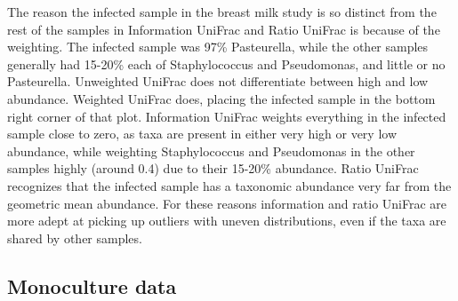\documentclass[10pt,letterpaper]{article}
\begin{document}
The reason the infected sample in the breast milk study is so distinct from the rest of the samples in Information UniFrac and Ratio UniFrac is because of the weighting. The infected sample was 97\% Pasteurella, while the other samples generally had 15-20\% each of Staphylococcus and Pseudomonas, and little or no Pasteurella. Unweighted UniFrac does not differentiate between high and low abundance. Weighted UniFrac does, placing the infected sample in the bottom right corner of that plot. Information UniFrac weights everything in the infected sample close to zero, as taxa are present in either very high or very low abundance, while weighting Staphylococcus and Pseudomonas in the other samples highly (around 0.4) due to their 15-20\% abundance. Ratio UniFrac recognizes that the infected sample has a taxonomic abundance very far from the geometric mean abundance. For these reasons information and ratio UniFrac are more adept at picking up outliers with uneven distributions, even if the taxa are shared by other samples.

\FloatBarrier

\subsection{Monoculture data}
\end{document}
